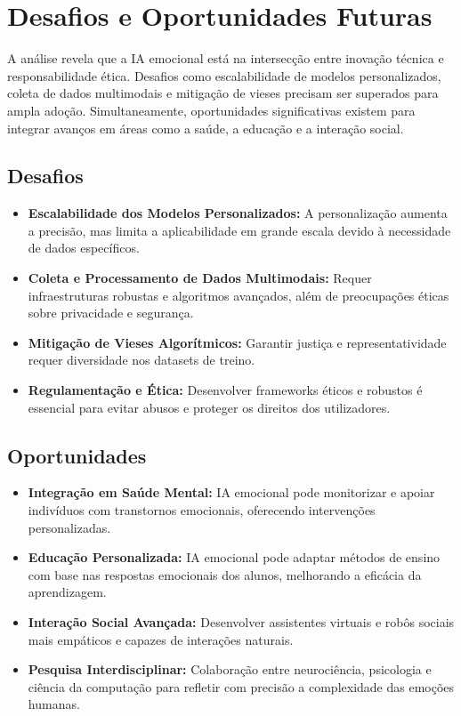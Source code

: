 \documentclass[a4paper,12pt]{report}
\begin{document}
	
	
	
	\section{Desafios e Oportunidades Futuras}
	
	A análise revela que a IA emocional está na intersecção entre inovação técnica e responsabilidade ética. Desafios como escalabilidade de modelos personalizados, coleta de dados multimodais e mitigação de vieses precisam ser superados para ampla adoção. Simultaneamente, oportunidades significativas existem para integrar avanços em áreas como a saúde, a educação e a interação social.
	
	\subsection{Desafios}
	
	\begin{itemize}
		\item \textbf{Escalabilidade dos Modelos Personalizados:} A personalização aumenta a precisão, mas limita a aplicabilidade em grande escala devido à necessidade de dados específicos.
		\item \textbf{Coleta e Processamento de Dados Multimodais:} Requer infraestruturas robustas e algoritmos avançados, além de preocupações éticas sobre privacidade e segurança.
		\item \textbf{Mitigação de Vieses Algorítmicos:} Garantir justiça e representatividade requer diversidade nos datasets de treino.
		\item \textbf{Regulamentação e Ética:} Desenvolver frameworks éticos e robustos é essencial para evitar abusos e proteger os direitos dos utilizadores.
	\end{itemize}
	
	\subsection{Oportunidades}
	
	\begin{itemize}
		\item \textbf{Integração em Saúde Mental:} IA emocional pode monitorizar e apoiar indivíduos com transtornos emocionais, oferecendo intervenções personalizadas.
		\item \textbf{Educação Personalizada:} IA emocional pode adaptar métodos de ensino com base nas respostas emocionais dos alunos, melhorando a eficácia da aprendizagem.
		\item \textbf{Interação Social Avançada:} Desenvolver assistentes virtuais e robôs sociais mais empáticos e capazes de interações naturais.
		\item \textbf{Pesquisa Interdisciplinar:} Colaboração entre neurociência, psicologia e ciência da computação para refletir com precisão a complexidade das emoções humanas.
	\end{itemize}
	
\end{document}
